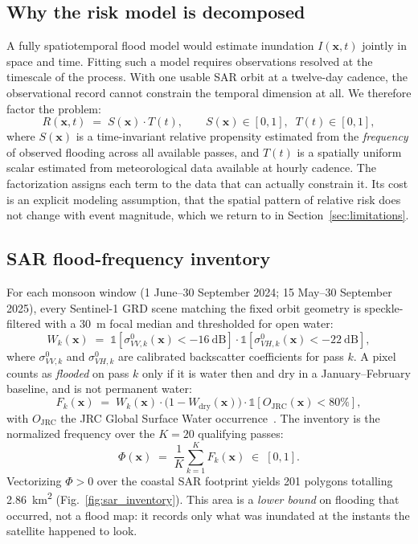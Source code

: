 \documentclass[10pt,twocolumn]{article}
\newcommand{\Sx}{S(\mathbf{x})}
\newcommand{\Tt}{T(t)}
\newcommand{\Rxt}{R(\mathbf{x},t)}
\begin{document}
\subsection{Why the risk model is decomposed}
\label{sec:method-decomp}
A fully spatiotemporal flood model would estimate inundation
$I(\mathbf{x},t)$ jointly in space and time. Fitting such a model requires
observations resolved at the timescale of the process. With one usable SAR orbit
at a twelve-day cadence, the observational record cannot constrain the temporal
dimension at all. We therefore factor the problem:
\begin{equation}
\Rxt \;=\; \Sx \cdot \Tt,
\qquad \Sx\in[0,1],\;\; \Tt\in[0,1],
\label{eq:fusion}
\end{equation}
where $\Sx$ is a time-invariant relative propensity estimated from the
\emph{frequency} of observed flooding across all available passes, and $\Tt$ is a
spatially uniform scalar estimated from meteorological data available at hourly
cadence. The factorization assigns each term to the data that can actually
constrain it. Its cost is an explicit modeling assumption, that the spatial
pattern of relative risk does not change with event magnitude, which we return to
in Section~\ref{sec:limitations}.

\subsection{SAR flood-frequency inventory}
For each monsoon window (1 June--30 September 2024; 15 May--30 September 2025),
every Sentinel-1 GRD scene matching the fixed orbit geometry is speckle-filtered
with a \SI{30}{\metre} focal median and thresholded for open water:
\begin{equation}
W_k(\mathbf{x}) \;=\;
\mathbb{1}\!\left[\sigma^0_{VV,k}(\mathbf{x}) < \SI{-16}{\deci\bel}\right]\cdot
\mathbb{1}\!\left[\sigma^0_{VH,k}(\mathbf{x}) < \SI{-22}{\deci\bel}\right],
\label{eq:water}
\end{equation}
where $\sigma^0_{VV,k}$ and $\sigma^0_{VH,k}$ are calibrated backscatter
coefficients for pass $k$. A pixel counts as \emph{flooded} on pass $k$ only if it
is water then and dry in a January--February baseline, and is not permanent water:
\begin{equation}
F_k(\mathbf{x}) \;=\; W_k(\mathbf{x})\cdot\bigl(1-W_{\text{dry}}(\mathbf{x})\bigr)
\cdot\mathbb{1}\!\left[O_{\text{JRC}}(\mathbf{x}) < 80\%\right],
\label{eq:floodpass}
\end{equation}
with $O_{\text{JRC}}$ the JRC Global Surface Water occurrence~\citep{pekel2016}.
The inventory is the normalized frequency over the $K=20$ qualifying passes:
\begin{equation}
\Phi(\mathbf{x}) \;=\; \frac{1}{K}\sum_{k=1}^{K} F_k(\mathbf{x}) \;\in\; [0,1].
\label{eq:freq}
\end{equation}
Vectorizing $\Phi>0$ over the coastal SAR footprint yields 201 polygons totalling
\SI{2.86}{\kilo\metre\squared} (Fig.~\ref{fig:sar_inventory}). This area is a
\emph{lower bound} on flooding that occurred, not a flood map: it records only
what was inundated at the instants the satellite happened to look.
\end{document}
